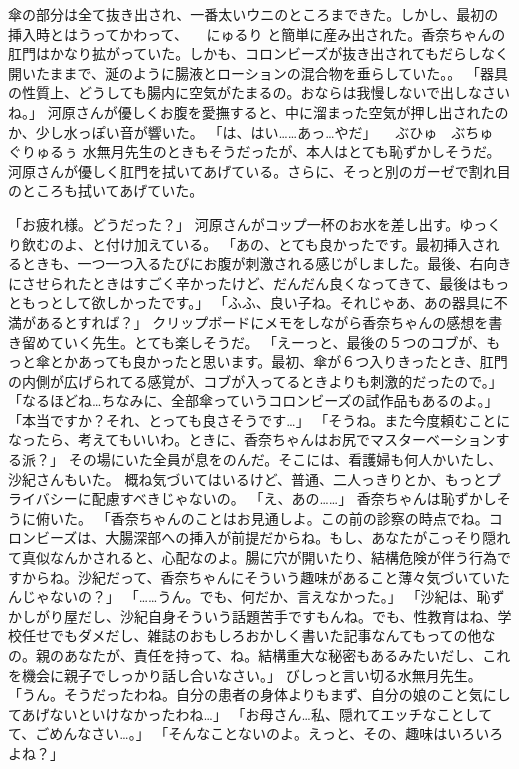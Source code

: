 傘の部分は全て抜き出され、一番太いウニのところまできた。しかし、最初の挿入時とはうってかわって、
　にゅるり
と簡単に産み出された。香奈ちゃんの肛門はかなり拡がっていた。しかも、コロンビーズが抜き出されてもだらしなく開いたままで、涎のように腸液とローションの混合物を垂らしていた。。
「器具の性質上、どうしても腸内に空気がたまるの。おならは我慢しないで出しなさいね。」
河原さんが優しくお腹を愛撫すると、中に溜まった空気が押し出されたのか、少し水っぽい音が響いた。
「は、はい……あっ…やだ」
　ぶひゅ　ぶちゅ　ぐりゅるぅ
水無月先生のときもそうだったが、本人はとても恥ずかしそうだ。
河原さんが優しく肛門を拭いてあげている。さらに、そっと別のガーゼで割れ目のところも拭いてあげていた。

「お疲れ様。どうだった？」
河原さんがコップ一杯のお水を差し出す。ゆっくり飲むのよ、と付け加えている。
「あの、とても良かったです。最初挿入されるときも、一つ一つ入るたびにお腹が刺激される感じがしました。最後、右向きにさせられたときはすごく辛かったけど、だんだん良くなってきて、最後はもっともっとして欲しかったです。」
「ふふ、良い子ね。それじゃあ、あの器具に不満があるとすれば？」
クリップボードにメモをしながら香奈ちゃんの感想を書き留めていく先生。とても楽しそうだ。
「えーっと、最後の５つのコブが、もっと傘とかあっても良かったと思います。最初、傘が６つ入りきったとき、肛門の内側が広げられてる感覚が、コブが入ってるときよりも刺激的だったので。」
「なるほどね…ちなみに、全部傘っていうコロンビーズの試作品もあるのよ。」
「本当ですか？それ、とっても良さそうです…」
「そうね。また今度頼むことになったら、考えてもいいわ。ときに、香奈ちゃんはお尻でマスターベーションする派？」
その場にいた全員が息をのんだ。そこには、看護婦も何人かいたし、沙紀さんもいた。
概ね気づいてはいるけど、普通、二人っきりとか、もっとプライバシーに配慮すべきじゃないの。
「え、あの……」
香奈ちゃんは恥ずかしそうに俯いた。
「香奈ちゃんのことはお見通しよ。この前の診察の時点でね。コロンビーズは、大腸深部への挿入が前提だからね。もし、あなたがこっそり隠れて真似なんかされると、心配なのよ。腸に穴が開いたり、結構危険が伴う行為ですからね。沙紀だって、香奈ちゃんにそういう趣味があること薄々気づいていたんじゃないの？」
「……うん。でも、何だか、言えなかった。」
「沙紀は、恥ずかしがり屋だし、沙紀自身そういう話題苦手ですもんね。でも、性教育はね、学校任せでもダメだし、雑誌のおもしろおかしく書いた記事なんてもっての他なの。親のあなたが、責任を持って、ね。結構重大な秘密もあるみたいだし、これを機会に親子でしっかり話し合いなさい。」
びしっと言い切る水無月先生。
「うん。そうだったわね。自分の患者の身体よりもまず、自分の娘のこと気にしてあげないといけなかったわね…」
「お母さん…私、隠れてエッチなことしてて、ごめんなさい…。」
「そんなことないのよ。えっと、その、趣味はいろいろよね？」

